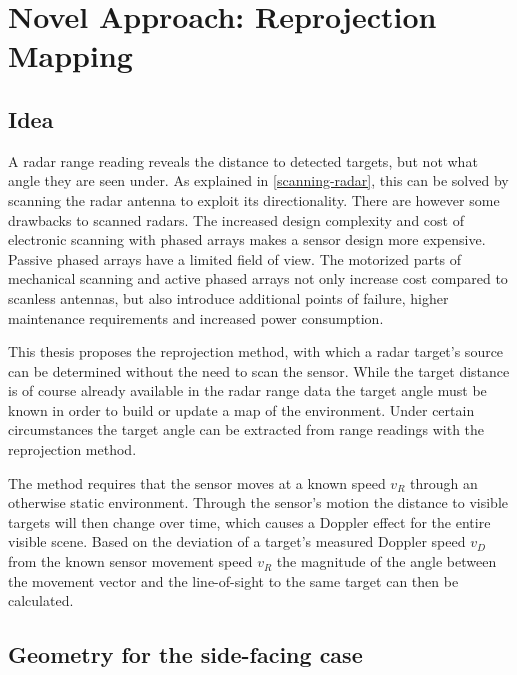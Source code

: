 
\chapter{Novel Approach: Reprojection
Mapping}\label{novel-approach-reprojection-mapping}

\section{Idea}\label{idea}

A radar range reading reveals the distance to detected targets, but not what angle they are seen under. As explained in \cref{scanning-radar}, this can be solved by scanning the radar antenna to exploit its directionality. There are however some drawbacks to scanned radars. The increased design complexity and cost of electronic scanning with phased arrays makes a sensor design more expensive. Passive phased arrays have a limited field of view. The motorized parts of mechanical scanning and active phased arrays not only increase cost compared to scanless antennas, but also introduce additional points of failure, higher maintenance requirements and increased power consumption.

This thesis proposes the reprojection method, with which a radar target's source can be determined without the need to scan the sensor. While the target distance is of course already available in the radar range data the target angle must be known in order to build or update a map of the environment. Under certain circumstances the target angle can be extracted from range readings with the reprojection method.

The method requires that the sensor moves at a known speed \(v_R\) through an otherwise static environment. Through the sensor's motion the distance to visible targets will then change over time, which causes a Doppler effect for the entire visible scene. Based on the deviation of a target's measured Doppler speed \(v_D\) from the known sensor movement speed \(v_R\) the magnitude of the angle between the movement vector and the line-of-sight to the same target can then be calculated.

\section{Geometry for the side-facing case}\label{geometry-for-the-side-facing-case}

